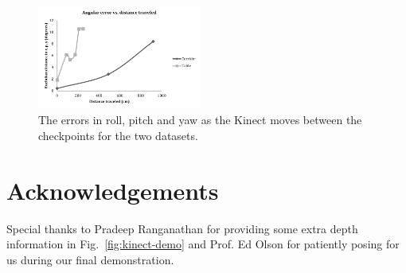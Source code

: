 \documentclass[letterpaper, 10pt, conference]{ieeeconf}
\begin{document}
\begin{figure}[t]
\centering
\includegraphics[width=0.48\textwidth]{figures/gt_angular.pdf}
\caption{The errors in roll, pitch and yaw as the Kinect moves between the checkpoints
for the two datasets.}
\label{fig:plot-angular}
\end{figure}

\section*{Acknowledgements}
Special thanks to Pradeep Ranganathan for providing some extra depth
information in Fig.~\ref{fig:kinect-demo} and Prof. Ed Olson for patiently
posing for us during our final demonstration.



\end{document}
